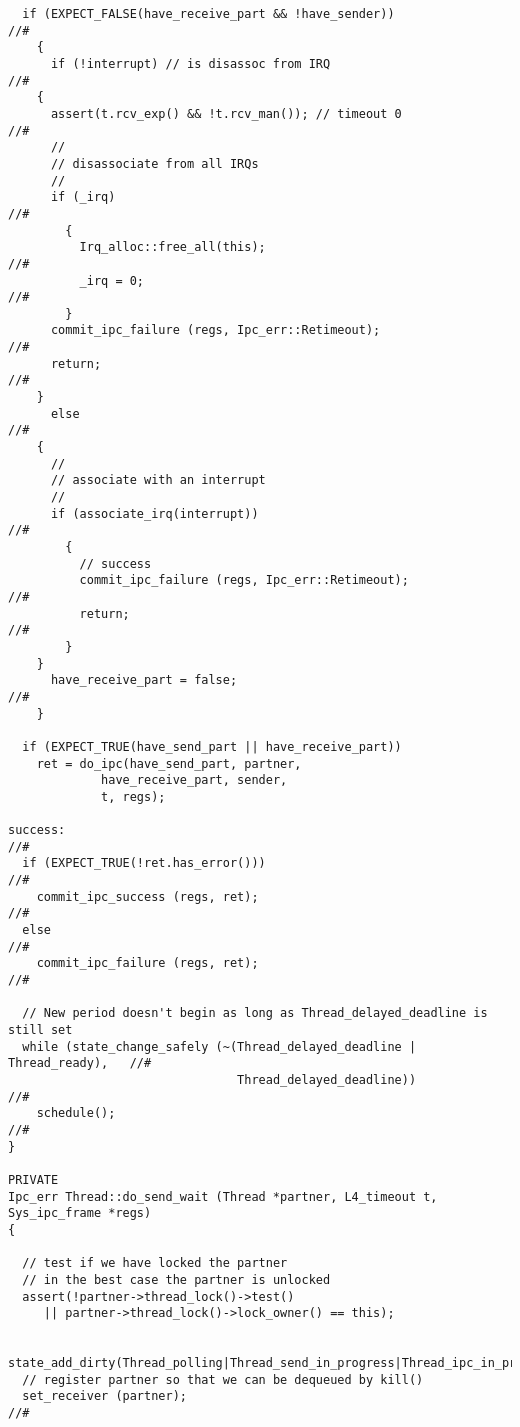 \begin{lstlisting}
  if (EXPECT_FALSE(have_receive_part && !have_sender))                     //#
    {
      if (!interrupt) // is disassoc from IRQ                              //#
	{
	  assert(t.rcv_exp() && !t.rcv_man()); // timeout 0                //#
	  //
	  // disassociate from all IRQs 
	  //
	  if (_irq)                                                        //#
	    {
	      Irq_alloc::free_all(this);                                   //#
	      _irq = 0;                                                    //#
	    }
	  commit_ipc_failure (regs, Ipc_err::Retimeout);                   //#
	  return;                                                          //#
	}
      else                                                                 //#
	{
	  //
	  // associate with an interrupt
	  //
	  if (associate_irq(interrupt))                                    //#
	    {
	      // success
	      commit_ipc_failure (regs, Ipc_err::Retimeout);               //#
	      return;                                                      //#
	    }
	}
      have_receive_part = false;                                           //#
    }

  if (EXPECT_TRUE(have_send_part || have_receive_part))      
    ret = do_ipc(have_send_part, partner,
	         have_receive_part, sender,
	         t, regs);
  
success:                                                                   //#
  if (EXPECT_TRUE(!ret.has_error()))                                       //#
    commit_ipc_success (regs, ret);                                        //#
  else                                                                     //# 
    commit_ipc_failure (regs, ret);                                        //# 

  // New period doesn't begin as long as Thread_delayed_deadline is still set
  while (state_change_safely (~(Thread_delayed_deadline | Thread_ready),   //#
                                Thread_delayed_deadline))                  //#  
    schedule();                                                            //#
}

PRIVATE
Ipc_err Thread::do_send_wait (Thread *partner, L4_timeout t, Sys_ipc_frame *regs)
{

  // test if we have locked the partner 
  // in the best case the partner is unlocked
  assert(!partner->thread_lock()->test()                                   
  	 || partner->thread_lock()->lock_owner() == this);                 

  state_add_dirty(Thread_polling|Thread_send_in_progress|Thread_ipc_in_progress);
  // register partner so that we can be dequeued by kill()
  set_receiver (partner);                                                  //#


\end{lstlisting}
